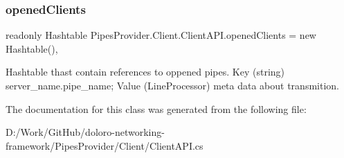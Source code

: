 \subsubsection{\texorpdfstring{opened\+Clients}{openedClients}}
{\footnotesize\ttfamily readonly Hashtable Pipes\+Provider.\+Client.\+Client\+A\+P\+I.\+opened\+Clients = new Hashtable()\hspace{0.3cm}{\ttfamily [static]}, {\ttfamily [private]}}



Hashtable thast contain references to oppened pipes. Key (string) server\+\_\+name.\+pipe\+\_\+name; Value (Line\+Processor) meta data about transmition. 



The documentation for this class was generated from the following file\+:\begin{DoxyCompactItemize}
\item 
D\+:/\+Work/\+Git\+Hub/doloro-\/networking-\/framework/\+Pipes\+Provider/\+Client/Client\+A\+P\+I.\+cs\end{DoxyCompactItemize}
